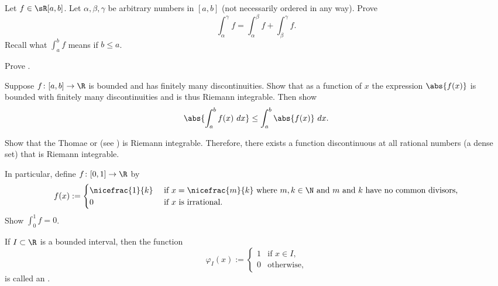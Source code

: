 \documentclass[12pt]{book}
\begin{document}
\begin{exercise}
Let $f \in \sR[a,b]$.
Let $\alpha, \beta, \gamma$ be arbitrary numbers in
$[a,b]$ (not necessarily ordered in any way).
Prove 
\begin{equation*}
\int_\alpha^\gamma f =
\int_\alpha^\beta f +
\int_\beta^\gamma f .
\end{equation*}
Recall what $\int_a^b f$ means if $b \leq a$.
\end{exercise}

\begin{exercise}
Prove .
\end{exercise}

\begin{exercise} \label{exercise:easyabsint}
Suppose $f \colon [a,b] \to \R$ is bounded and
has finitely many discontinuities.
Show that as a function of $x$ the expression $\abs{f(x)}$ is bounded with finitely many
discontinuities and is thus Riemann integrable.
Then show 
\begin{equation*}
\abs{\int_a^b f(x)~dx} \leq \int_a^b \abs{f(x)}~dx .
\end{equation*}
\end{exercise}

\begin{exercise}[Hard]
Show that the
Thomae or 
(see )
is Riemann integrable.
Therefore, there exists a
function discontinuous at all rational numbers (a dense set)
that is Riemann integrable.

In particular,
define $f \colon [0,1] \to \R$ by
\begin{equation*}
f(x) := 
\begin{cases}
\nicefrac{1}{k} & \text{ if $x=\nicefrac{m}{k}$ where $m,k \in \N$
and $m$ and $k$ have no common divisors,} \\
0 & \text{ if $x$ is irrational}.
\end{cases}
\end{equation*}
Show $\int_0^1 f = 0$.
\end{exercise}


\begin{exnote}
If $I \subset \R$ is a bounded interval, then
the function
\begin{equation*}
\varphi_I(x) :=
\begin{cases}
1 & \text{if $x \in I$,} \\
0 & \text{otherwise,}
\end{cases}
\end{equation*}
is called an \emph{}.
\end{exnote}
\end{document}

